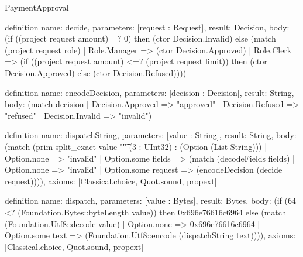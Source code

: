 \begin{lexlean}{PaymentApproval}
\begin{semanticmodule}
definition{
  name: decide,
  parameters: [request : Request],
  result: Decision,
  body: (if ((project request amount) =? 0) then (ctor Decision.Invalid) else (match (project request role)
    | Role.Manager => (ctor Decision.Approved)
    | Role.Clerk => (if ((project request amount) <=? (project request limit)) then (ctor Decision.Approved) else (ctor Decision.Refused))))
}

definition{
  name: encodeDecision,
  parameters: [decision : Decision],
  result: String,
  body: (match decision
    | Decision.Approved => "approved"
    | Decision.Refused => "refused"
    | Decision.Invalid => "invalid")
}

definition{
  name: dispatchString,
  parameters: [value : String],
  result: String,
  body: (match (prim split_exact value "\t" (3 : UInt32) : (Option (List String)))
    | Option.none => "invalid"
    | Option.some fields => (match (decodeFields fields)
      | Option.none => "invalid"
      | Option.some request => (encodeDecision (decide request)))),
  axioms: [Classical.choice, Quot.sound, propext]
}

definition{
  name: dispatch,
  parameters: [value : Bytes],
  result: Bytes,
  body: (if (64 <? (Foundation.Bytes::byteLength value)) then 0x696e76616c6964 else (match (Foundation.Utf8::decode value)
    | Option.none => 0x696e76616c6964
    | Option.some text => (Foundation.Utf8::encode (dispatchString text)))),
  axioms: [Classical.choice, Quot.sound, propext]
}
\end{semanticmodule}
\end{lexlean}

